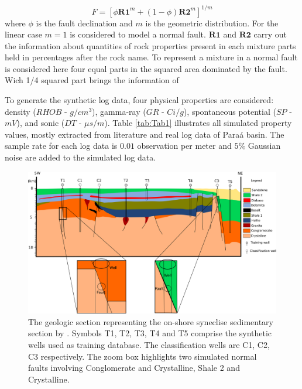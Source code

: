 \documentclass[preprint,12pt]{elsarticle}
\begin{document}
\begin{equation}
	F=[\phi \textbf{R1}^{m} + (1-\phi)\textbf{R2}^{m}]^{1/m}
	\label{misturelaw}
\end{equation}
      where $\phi$ is the fault declination and $m$ is the geometric distribution. For the linear case $m=1$ is considered to model a normal fault. $\textbf{R1}$ and $\textbf{R2}$ carry out the information about quantities of rock properties present in each mixture parts held in percentages after the rock name. To represent a mixture in a normal fault is considered here four equal parts in the squared area dominated by the fault. Wich  1/4 squared part brings the information of   
 


 
To generate the synthetic log data, four physical properties are considered: density ($RHOB$ - $g/cm^{3}$),  gamma-ray ($GR$ - $Ci/g$), spontaneous potential ($SP$ - $mV$), and sonic ($DT$ - $\mu s/ m$). Table \ref{tab:Tab1} illustrates all simulated property values, mostly extracted from literature \citep{bassiouni1994} and real log data of Para\'a basin. The sample rate for each log data is $0.01$ observation per meter and $5$\% Gaussian noise are added to the simulated log data. 

\begin{figure}[!htb]
	\centering
	\includegraphics[scale=0.5]{imagens/Basin.png}
	\caption{The geologic section representing the on-shore syneclise sedimentary section by \cite{Sal2008}. Symbols T1, T2, T3, T4 and T5 comprise the synthetic wells used as training database. The classification wells are C1, C2, C3 respectively. The zoom box highlights two simulated normal faults involving Conglomerate and Crystalline, Shale 2 and Crystalline.}
	\label{fig:Model}
\end{figure}
\end{document}
